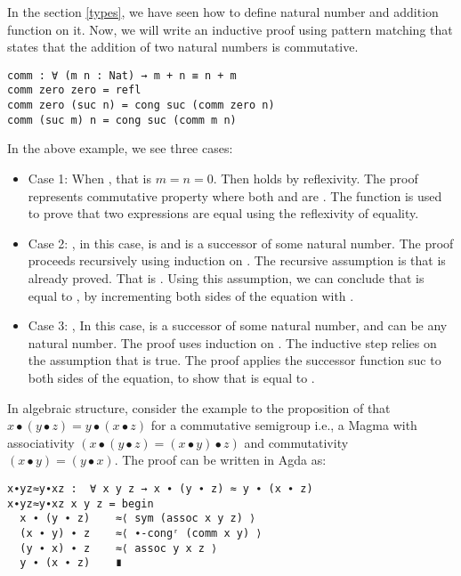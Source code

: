 In the section \ref{types}, we have seen how to define natural number and addition
function on it. Now, we will write an inductive proof using pattern matching
that states that the addition of two natural numbers is commutative.

\begin{verbatim}
comm : ∀ (m n : Nat) → m + n ≡ n + m
comm zero zero = refl
comm zero (suc n) = cong suc (comm zero n)
comm (suc m) n = cong suc (comm m n)
\end{verbatim}

In the above example, we see three cases:
\begin{itemize}
  \item Case 1: When , that is $m = n = 0$. Then
 holds by reflexivity. The proof  represents commutative property where both  and  are
. The  function is used to prove that two expressions
are equal using the reflexivity of equality.
\item Case 2: , in this case,  is 
and  is a successor of some natural number. The proof proceeds
recursively using induction on . The recursive assumption is that
 is already proved. That is .
Using this assumption, we can conclude that  is equal to
, by incrementing both sides of the equation with
.
\item Case 3: , In this case,  is a successor
of some natural number, and  can be any natural number. The proof uses
induction on . The inductive step relies on the assumption that
 is true. The proof applies the successor function suc to both
sides of the equation, to show that  is equal to .
\end{itemize}
In algebraic structure, consider the example to the proposition of that $x ∙ (y
∙ z) = y ∙ (x ∙ z)$  for a commutative semigroup i.e., a Magma with
associativity $(x ∙ (y ∙ z) = (x ∙ y) ∙ z)$ and commutativity $(x ∙ y) = (y ∙
x)$. The proof can be written in Agda as:

\begin{verbatim}
x∙yz≈y∙xz :  ∀ x y z → x ∙ (y ∙ z) ≈ y ∙ (x ∙ z)
x∙yz≈y∙xz x y z = begin
  x ∙ (y ∙ z)    ≈⟨ sym (assoc x y z) ⟩
  (x ∙ y) ∙ z    ≈⟨ ∙-congʳ (comm x y) ⟩
  (y ∙ x) ∙ z    ≈⟨ assoc y x z ⟩
  y ∙ (x ∙ z)    ∎
\end{verbatim}

